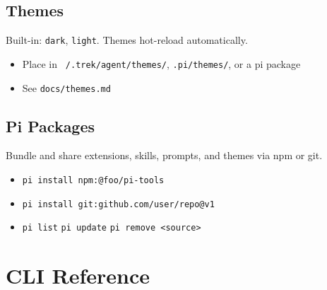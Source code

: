 \documentclass[12pt]{article}
\begin{document}
\subsection*{Themes}
Built-in: \texttt{dark}, \texttt{light}. Themes hot-reload automatically.
\begin{itemize}
    \item Place in \texttt{~/.trek/agent/themes/}, \texttt{.pi/themes/}, or a pi package
    \item See \texttt{docs/themes.md}
\end{itemize}

\subsection*{Pi Packages}
Bundle and share extensions, skills, prompts, and themes via npm or git.
\begin{itemize}
    \item \texttt{pi install npm:@foo/pi-tools}
    \item \texttt{pi install git:github.com/user/repo@v1}
    \item \texttt{pi list} \quad \texttt{pi update} \quad \texttt{pi remove <source>}
\end{itemize}

\section{CLI Reference}
\end{document}
